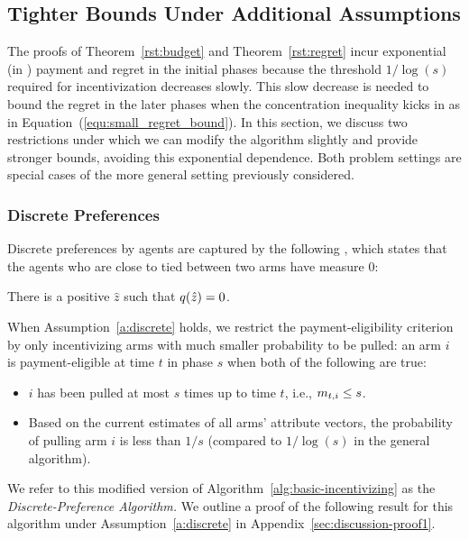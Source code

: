 \subsection{Tighter Bounds Under Additional Assumptions}

The proofs of Theorem~\ref{rst:budget} and Theorem~\ref{rst:regret}
incur exponential (in \ARMNUM) payment and regret in the initial
phases because the threshold $1/\log(s)$ required for incentivization
decreases slowly. 
This slow decrease is needed to bound the regret in the later phases
when the concentration inequality kicks in as in
Equation~(\ref{equ:small_regret_bound}).
In this section, we discuss two restrictions under which we can
modify the algorithm slightly and provide stronger bounds,
avoiding this exponential dependence.
Both problem settings are special cases of the more general
setting previously considered. 

\subsubsection{Discrete Preferences}
\label{subsec:discrete}
Discrete preferences by agents are captured by the following
,
which states that the agents who are close to tied between
two arms have measure 0:

\begin{assumption}
\label{a:discrete}
There is a positive $\hat{z}$ such that
$q(\hat{z}) = 0$.
\end{assumption}

When Assumption~\ref{a:discrete} holds,
we restrict the payment-eligibility criterion by only incentivizing
arms with much smaller probability to be pulled:
an arm $i$ is payment-eligible at time $t$ in phase $s$ when both of
the following are true: 

\begin{itemize}
\item $i$ has been pulled at most $s$ times up to time $t$,
i.e., $m_{t,i} \leq s$.
\item Based on the current estimates  of all arms' attribute vectors,
the probability of pulling arm $i$ is less than $1/s$
(compared to $1/\log(s)$ in the general algorithm).
\end{itemize}

We refer to this modified version of
Algorithm~\ref{alg:basic-incentivizing} as the
\emph{Discrete-Preference Algorithm.}
We outline a proof of the following result for this algorithm under
Assumption~\ref{a:discrete} in Appendix~\ref{sec:discussion-proof1}.

